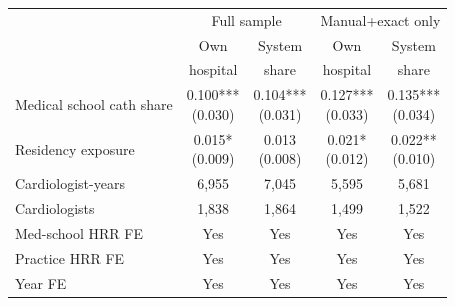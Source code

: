 \begin{tabular}{lcccc}
\toprule
 & \multicolumn{2}{c}{Full sample} & \multicolumn{2}{c}{Manual+exact only} \\
\cmidrule(lr){2-3} \cmidrule(lr){4-5}
 & Own & System & Own & System \\
 & hospital & share & hospital & share \\
\midrule
Medical school cath share & \shortstack[c]{0.100*** \\ (0.030)} & \shortstack[c]{0.104*** \\ (0.031)} & \shortstack[c]{0.127*** \\ (0.033)} & \shortstack[c]{0.135*** \\ (0.034)} \\
Residency exposure & \shortstack[c]{0.015* \\ (0.009)} & \shortstack[c]{0.013 \\ (0.008)} & \shortstack[c]{0.021* \\ (0.012)} & \shortstack[c]{0.022** \\ (0.010)} \\
\midrule
Cardiologist-years & 6,955 & 7,045 & 5,595 & 5,681 \\
Cardiologists & 1,838 & 1,864 & 1,499 & 1,522 \\
Med-school HRR FE & Yes & Yes & Yes & Yes \\
Practice HRR FE & Yes & Yes & Yes & Yes \\
Year FE & Yes & Yes & Yes & Yes \\
\bottomrule
\end{tabular}

